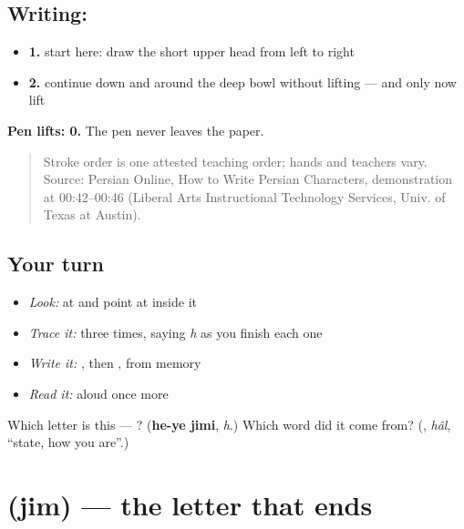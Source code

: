\subsection*{Writing: }

\begin{itemize}
\raggedright
  \item \textbf{1.} start here: draw the short upper head from left to right
  \item \textbf{2.} continue down and around the deep bowl without lifting — and only now lift
\end{itemize}

\textbf{Pen lifts: 0.} The pen never leaves the paper.

\begin{quote}
Stroke order is one attested teaching order; hands and teachers vary. Source: Persian Online, How to Write Persian Characters,  demonstration at 00:42–00:46 (Liberal Arts Instructional Technology Services, Univ. of Texas at Austin).
\end{quote}

\subsection*{Your turn}
\begin{itemize}
\raggedright
  \item \emph{Look:} at \textbf{} and point at  inside it
  \item \emph{Trace it:}  three times, saying \emph{h} as you finish each one
  \item \emph{Write it:} , then , from memory
  \item \emph{Read it:} \textbf{} aloud once more
\end{itemize}

\begin{tcolorbox}[breakable,colback=teal!4,colframe=teal!35!black,title={Before you move on}]
Which letter is this — ? (\textbf{he-ye jimi}, \emph{h}.) Which word did it come from? (\textbf{}, \emph{hâl}, \textquotedblleft{}state, how you are\textquotedblright{}.)
\end{tcolorbox}
\section[\texorpdfstring{\fa{ج} (jim)}{ج (jim)}]{ (jim) — the letter that ends }

